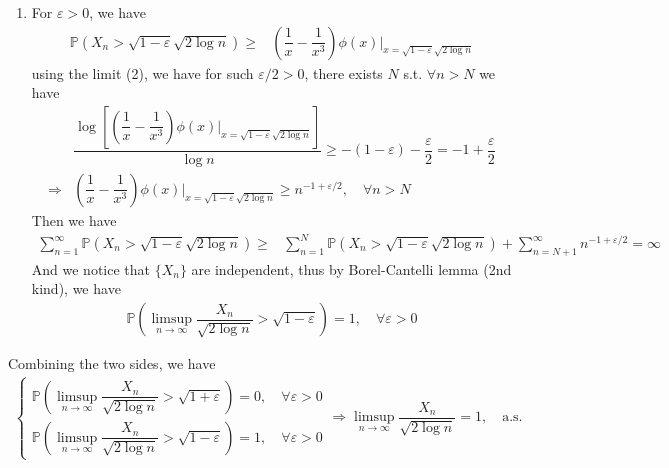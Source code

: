 \documentclass[11pt,a4paper]{article}
\numberwithin{equation}{section}%
\begin{document}
\begin{enumerate}[topsep=2pt,itemsep=2pt]
    
    \item For $ \varepsilon >0 $, we have
    \begin{align*}
        \mathbb{P}\left( X_n> \sqrt{1-\varepsilon }\sqrt{2\log n} \right) \geq &  \left(\dfrac{ 1 }{ x } - \dfrac{ 1 }{ x^3 }\right) \phi(x) \Big|_{x=\sqrt{1-\varepsilon }\sqrt{2\log n}} 
    \end{align*}
    using the limit (2), we have for such $ \varepsilon /2 >0 $, there exists $ N $ s.t. $ \forall n>N $ we have
    \begin{align*}
        &\dfrac{ \log \left[ \left(\dfrac{ 1 }{ x } - \dfrac{ 1 }{ x^3 }\right) \phi(x) \Big|_{x=\sqrt{1-\varepsilon }\sqrt{2\log n}} \right] }{ \log n } \geq -(1-\varepsilon )-\dfrac{ \varepsilon  }{ 2 } = -1+\dfrac{ \varepsilon  }{ 2 } \\
        \Rightarrow& \left(\dfrac{ 1 }{ x } - \dfrac{ 1 }{ x^3 }\right) \phi(x) \Big|_{x=\sqrt{1-\varepsilon }\sqrt{2\log n}} \geq n^{-1+\varepsilon /2} ,\quad \forall n>N 
    \end{align*}
    Then we have
    \begin{align*}
        \sum_{n=1}^\infty  \mathbb{P}\left( X_n> \sqrt{1-\varepsilon }\sqrt{2\log n} \right) \geq & \sum_{n=1}^N  \mathbb{P}\left( X_n> \sqrt{1-\varepsilon }\sqrt{2\log n} \right) + \sum_{n=N+1}^\infty n^{-1+\varepsilon /2} = \infty 
    \end{align*}
    And we notice that $ \{X_n\} $ are independent, thus by Borel-Cantelli lemma (2nd kind), we have
    \begin{align*}
        \mathbb{P}\left( \limsup _{n\to\infty }\dfrac{ X_n }{ \sqrt{2\log n}  }> \sqrt{1-\varepsilon }   \right) = 1 ,\quad \forall \varepsilon >0 
    \end{align*}
    
\end{enumerate}


Combining the two sides, we have
\begin{align*}
    \begin{cases}
        \mathbb{P}\left( \limsup _{n\to\infty }\dfrac{ X_n }{ \sqrt{2\log n}  }> \sqrt{1+\varepsilon }   \right) = 0 ,\quad \forall \varepsilon >0\\
        \mathbb{P}\left( \limsup _{n\to\infty }\dfrac{ X_n }{ \sqrt{2\log n}  }> \sqrt{1-\varepsilon }   \right) = 1 ,\quad \forall \varepsilon >0
    \end{cases}  \Rightarrow \limsup _{n\to\infty }\dfrac{ X_n }{ \sqrt{2\log n}  }=1,\quad \text{a.s.}
\end{align*}
\end{document}
